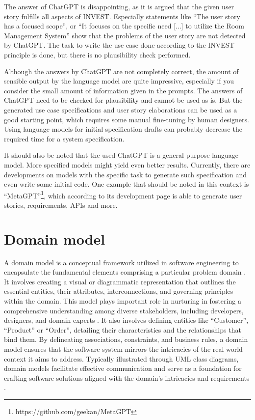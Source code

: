 \documentclass[conference,onecolumn]{IEEEtran}
\begin{document}
The answer of ChatGPT is disappointing, as it is argued that the given user story fulfills all aspects of INVEST. Especially statements like ``The user story has a focused scope'', or ``It focuses on the specific need [...] to utilize the Room Management System'' show that the problems of the user story are not detected by ChatGPT. The task to write the use case done according to the INVEST principle is done, but there is no plausibility check performed.

Although the answers by ChatGPT are not completely correct, the amount of sensible output by the language model are quite impressive, especially if you consider the small amount of information given in the prompts.
The answers of ChatGPT need to be checked for plausibility and cannot be used as is. But the generated use case specifications and user story elaborations can be used as a good starting point, which requires some manual fine-tuning by human designers. Using language models for initial specification drafts can probably decrease the required time for a system specification.

It should also be noted that the used ChatGPT is a general purpose language model. More specified models might yield even better results.
Currently, there are developments on models with the specific task to generate such specification and even write some initial code. One example that should be noted in this context is ``MetaGPT''\footnote{https://github.com/geekan/MetaGPT}, which according to its development page is able to generate user stories, requirements, APIs and more.




\section{Domain model}
	A domain model is a conceptual framework utilized in software engineering to encapsulate the fundamental elements comprising a particular problem domain \cite{larman2012applying}. It involves creating a visual or diagrammatic representation that outlines the essential entities, their attributes, interconnections, and governing principles within the domain. This model plays important role in nurturing in fostering a comprehensive understanding among diverse stakeholders, including developers, designers, and domain experts \cite{fowler2004uml}. It also involves defining entities like ``Customer'', ``Product'' or ``Order'', detailing their characteristics and the relationships that bind them. By delineating associations, constraints, and business rules, a domain model ensures that the software system mirrors the intricacies of the real-world context it aims to address. Typically illustrated through UML class diagrams, domain models facilitate effective communication and serve as a foundation for crafting software solutions aligned with the domain's intricacies and requirements \cite{booch1994oo}.
\end{document}
